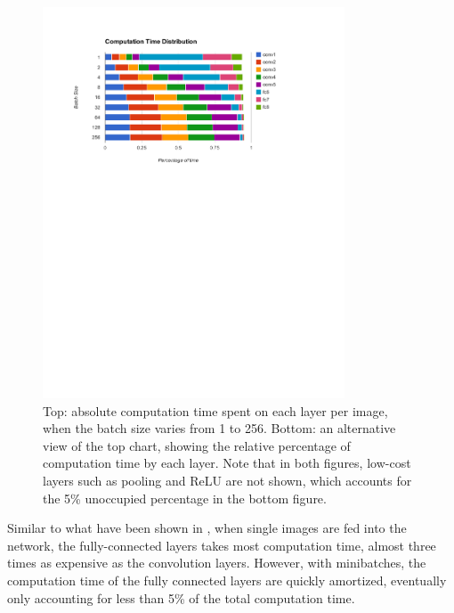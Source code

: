 \begin{figure}
  \includegraphics[width=0.8\textwidth]{figs/caffe/caffe_batchtime_relative.pdf}
  \caption{Top: absolute computation time spent on each layer per image, when the batch size varies from 1 to 256. Bottom: an alternative view of the top chart, showing the relative percentage of computation time by each layer. Note that in both figures, low-cost layers such as pooling and ReLU are not shown, which accounts for the 5\% unoccupied percentage in the bottom figure.}\label{fig:caffe:batchtime}
\end{figure}

Similar to what have been shown in \cite{donahue2013decaf}, when single images are fed into the network, the fully-connected layers takes most computation time, almost three times as expensive as the convolution layers. However, with minibatches, the computation time of the fully connected layers are quickly amortized, eventually only accounting for less than 5\% of the total computation time.

